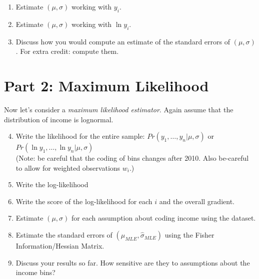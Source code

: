 \documentclass{article}
\begin{document}
\begin{enumerate}
\item Estimate $(\mu,\sigma)$ working with $y_i$.
\item Estimate $(\mu,\sigma)$ working with $\ln y_i$.
\item Discuss how you would compute an estimate of the standard errors of $(\mu,\sigma)$. For extra credit: compute them.
\end{enumerate}

\section*{\normalsize Part 2: Maximum Likelihood}

Now let's consider a \textit{maximum likelihood estimator}. Again assume that the distribution of income is lognormal. 
\begin{enumerate}
\setcounter{enumi}{3}
\item Write the likelihood for the entire sample:  $Pr(y_1,\ldots,y_n | \mu, \sigma)$ or $Pr(\ln y_1,\ldots, \ln y_n | \mu, \sigma)$ \\ (Note: be careful that the coding of bins changes after 2010. Also be-careful to allow for weighted observations $w_i$.)
\item Write the log-likelihood
\item Write the score of the log-likelihood for each $i$ and the overall gradient.
\item Estimate $(\mu,\sigma)$ for each assumption about coding income using the dataset.
\item Estimate the standard errors of $(\widehat{\mu}_{MLE},\widehat{\sigma}_{MLE})$ using the Fisher Information/Hessian Matrix.
\item Discuss your results so far. How sensitive are they to assumptions about the income bins? %
\end{enumerate}
\end{document}
